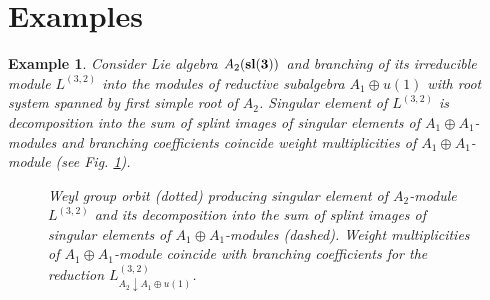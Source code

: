 \documentclass[12pt]{article}
\newtheorem{example}{Example}
\begin{document}
\section{Examples}
\label{sec:examples}
\begin{example}
  Consider Lie algebra $A_{2} (\bf{sl}(3))$ and branching of its irreducible module $L^{(3,2)}$ into the modules of reductive subalgebra $A_{1}\oplus u(1)$ with root system spanned by first simple root of $A_{2}$. Singular element of $L^{(3,2)}$ is decomposition into the sum of splint images of singular elements of $A_{1}\oplus A_{1}$-modules and branching coefficients coincide weight multiplicities of $A_{1}\oplus A_{1}$-module (see Fig. \ref{fig:a2_splint}).

  \begin{figure}[h!bt]
  \noindent{}
  \caption{Weyl group orbit (dotted) producing singular element of $A_{2}$-module $L^{(3,2)}$ and its decomposition into the sum of splint images of singular elements of $A_{1}\oplus A_{1}$-modules (dashed). Weight multiplicities of $A_{1}\oplus A_{1}$-module coincide with branching coefficients for the reduction $L^{(3,2)}_{A_{2}\downarrow A_{1}\oplus u(1)}$.}

 \label{fig:a2_splint}
\end{figure}
\end{example}
\end{document}
